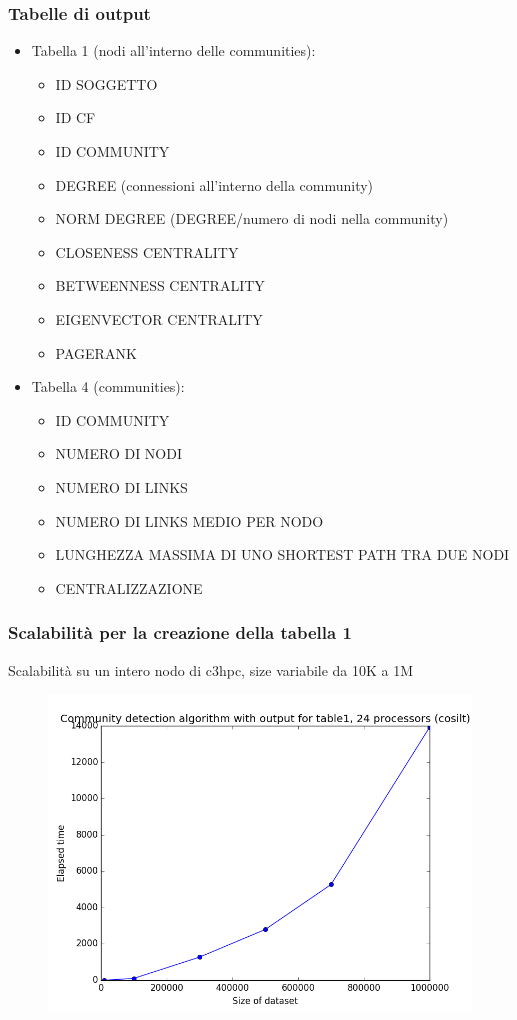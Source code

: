 \documentclass{beamer}
\begin{document}
\begin{frame}
 \frametitle{Tabelle di output}
 \begin{itemize}
 \item Tabella 1 (nodi all'interno delle communities):
 \begin{itemize}
\item ID SOGGETTO
\item ID CF
\item ID COMMUNITY
\item DEGREE (connessioni all'interno della community)
\item NORM DEGREE (DEGREE/numero di nodi nella community)
\item CLOSENESS CENTRALITY
\item BETWEENNESS CENTRALITY
\item EIGENVECTOR CENTRALITY
\item PAGERANK
\end{itemize}
 \item Tabella 4 (communities):
 \begin{itemize}
 \item ID COMMUNITY
 \item NUMERO DI NODI
 \item NUMERO DI LINKS
 \item NUMERO DI LINKS MEDIO PER NODO
 \item LUNGHEZZA MASSIMA DI UNO SHORTEST PATH TRA DUE NODI
 \item CENTRALIZZAZIONE
 \end{itemize}
 \end{itemize}

\end{frame}
\begin{frame}
 \frametitle{Scalabilità per la creazione della tabella 1}
 Scalabilità su un intero nodo di c3hpc, size variabile da 10K a 1M
  \begin{figure}[htbp]
\centering
\includegraphics[height=6.0 cm,width=10 cm]{24cores_table1.png}

\end{figure}
\end{frame}
\end{document}
